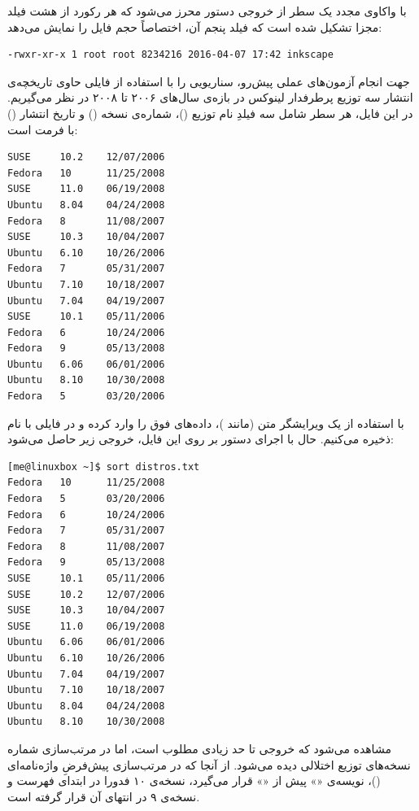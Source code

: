 با واکاوی مجدد یک سطر از خروجی دستور  محرز می‌شود که هر رکورد از هشت فیلد مجزا تشکیل شده است که فیلد پنجم آن، اختصاصاً حجم فایل را نمایش می‌دهد:

\begin{latin}
\begin{lstlisting}
-rwxr-xr-x 1 root root 8234216 2016-04-07 17:42 inkscape
\end{lstlisting}
\end{latin}

جهت انجام آزمون‌های عملی پیش‌رو، سناریویی را با استفاده از فایلی حاوی تاریخچه‌ی انتشار سه توزیع پرطرفدار لینوکس در بازه‌ی سال‌های ۲۰۰۶ تا ۲۰۰۸ در نظر می‌گیریم. در این فایل، هر سطر شامل سه فیلدِ نام توزیع ()، شماره‌ی نسخه () و تاریخ انتشار () با فرمت  است:

\begin{latin}
\begin{lstlisting}
SUSE     10.2    12/07/2006
Fedora   10      11/25/2008
SUSE     11.0    06/19/2008
Ubuntu   8.04    04/24/2008
Fedora   8       11/08/2007
SUSE     10.3    10/04/2007
Ubuntu   6.10    10/26/2006
Fedora   7       05/31/2007
Ubuntu   7.10    10/18/2007
Ubuntu   7.04    04/19/2007
SUSE     10.1    05/11/2006
Fedora   6       10/24/2006
Fedora   9       05/13/2008
Ubuntu   6.06    06/01/2006
Ubuntu   8.10    10/30/2008
Fedora   5       03/20/2006
\end{lstlisting}
\end{latin}

با استفاده از یک ویرایشگر متن (مانند )، داده‌های فوق را وارد کرده و در فایلی با نام  ذخیره می‌کنیم. حال با اجرای دستور  بر روی این فایل، خروجی زیر حاصل می‌شود:

\begin{latin}
\begin{lstlisting}
[me@linuxbox ~]$ sort distros.txt
Fedora   10      11/25/2008
Fedora   5       03/20/2006
Fedora   6       10/24/2006
Fedora   7       05/31/2007
Fedora   8       11/08/2007
Fedora   9       05/13/2008
SUSE     10.1    05/11/2006
SUSE     10.2    12/07/2006
SUSE     10.3    10/04/2007
SUSE     11.0    06/19/2008
Ubuntu   6.06    06/01/2006
Ubuntu   6.10    10/26/2006
Ubuntu   7.04    04/19/2007
Ubuntu   7.10    10/18/2007
Ubuntu   8.04    04/24/2008
Ubuntu   8.10    10/30/2008
\end{lstlisting}
\end{latin}

مشاهده می‌شود که خروجی تا حد زیادی مطلوب است، اما در مرتب‌سازی شماره نسخه‌های توزیع  اختلالی دیده می‌شود. از آنجا که در مرتب‌سازی پیش‌فرضِ واژه‌نامه‌ای ()، نویسه‌ی «» پیش از «» قرار می‌گیرد، نسخه‌ی ۱۰ فدورا در ابتدای فهرست و نسخه‌ی ۹ در انتهای آن قرار گرفته است.

